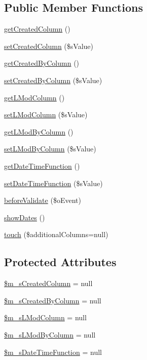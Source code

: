 \subsection*{Public Member Functions}
\begin{DoxyCompactItemize}
\item 
\hyperlink{classCPSTimeStampBehavior_a8f30d2f5137dec1a5bcba7f92bac85ea}{getCreatedColumn} ()
\item 
\hyperlink{classCPSTimeStampBehavior_ac971c96e31951188e5bdaa4a1b1bb830}{setCreatedColumn} (\$sValue)
\item 
\hyperlink{classCPSTimeStampBehavior_a0520eaecacbc08f3715a45f48b364dc1}{getCreatedByColumn} ()
\item 
\hyperlink{classCPSTimeStampBehavior_aad8ce1abdb4c67d3bba0b7e23eace5cc}{setCreatedByColumn} (\$sValue)
\item 
\hyperlink{classCPSTimeStampBehavior_adc811d2d32eb4d41d2f8258123fe816a}{getLModColumn} ()
\item 
\hyperlink{classCPSTimeStampBehavior_a3879514c9fffb4454e80ab7842b7b31f}{setLModColumn} (\$sValue)
\item 
\hyperlink{classCPSTimeStampBehavior_a387974600fbbb7e54a35e8d1872d217e}{getLModByColumn} ()
\item 
\hyperlink{classCPSTimeStampBehavior_a456d37e379c8461458723668d7e499a2}{setLModByColumn} (\$sValue)
\item 
\hyperlink{classCPSTimeStampBehavior_a256dd113f3eddd49910867cd68ec8fc3}{getDateTimeFunction} ()
\item 
\hyperlink{classCPSTimeStampBehavior_aefc5940715628851cc5f6a8c0889b9cd}{setDateTimeFunction} (\$sValue)
\item 
\hyperlink{classCPSTimeStampBehavior_aa5c060e82c03c840ac5f7cb630cd251b}{beforeValidate} (\$oEvent)
\item 
\hyperlink{classCPSTimeStampBehavior_ae99ec12f90f0458dbd6e2d9dcce34620}{showDates} ()
\item 
\hyperlink{classCPSTimeStampBehavior_aa5ac765fd764508a2e486e01a725b4a1}{touch} (\$additionalColumns=null)
\end{DoxyCompactItemize}
\subsection*{Protected Attributes}
\begin{DoxyCompactItemize}
\item 
\hyperlink{classCPSTimeStampBehavior_acb667183b5f36f920d81dd529029b1cb}{\$m\_\-sCreatedColumn} = null
\item 
\hyperlink{classCPSTimeStampBehavior_a878fd48a0be875af51d1713e5c7406cd}{\$m\_\-sCreatedByColumn} = null
\item 
\hyperlink{classCPSTimeStampBehavior_a2b569f58b9a9d36d7740ef74e38965d8}{\$m\_\-sLModColumn} = null
\item 
\hyperlink{classCPSTimeStampBehavior_ab00e4dbf2eb5aad2fa70ff6d024eb310}{\$m\_\-sLModByColumn} = null
\item 
\hyperlink{classCPSTimeStampBehavior_a36fc4c35bb816130af2c51aa1bf23cf2}{\$m\_\-sDateTimeFunction} = null
\end{DoxyCompactItemize}



